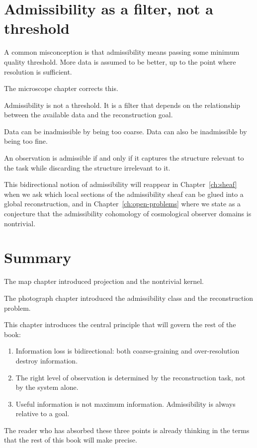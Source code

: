 \section{Admissibility as a filter, not a threshold}

A common misconception is that admissibility means passing some
minimum quality threshold.
More data is assumed to be better, up to the point where
resolution is sufficient.

The microscope chapter corrects this.

Admissibility is not a threshold.
It is a filter that depends on the relationship between the
available data and the reconstruction goal.

Data can be inadmissible by being too coarse.
Data can also be inadmissible by being too fine.

An observation is admissible if and only if it captures the
structure relevant to the task while discarding the structure
irrelevant to it.

This bidirectional notion of admissibility will reappear in
Chapter~\ref{ch:sheaf} when we ask which local sections of the
admissibility sheaf can be glued into a global reconstruction,
and in Chapter~\ref{ch:open-problems} where we state as a
conjecture that the admissibility cohomology of cosmological
observer domains is nontrivial.

\section{Summary}

The map chapter introduced projection and the nontrivial kernel.

The photograph chapter introduced the admissibility class and the
reconstruction problem.

This chapter introduces the central principle that will govern the
rest of the book:

\begin{enumerate}[leftmargin=2em]
  \item Information loss is bidirectional: both coarse-graining
    and over-resolution destroy information.
  \item The right level of observation is determined by the
    reconstruction task, not by the system alone.
  \item Useful information is not maximum information.
    Admissibility is always relative to a goal.
\end{enumerate}

The reader who has absorbed these three points is already thinking
in the terms that the rest of this book will make precise.
